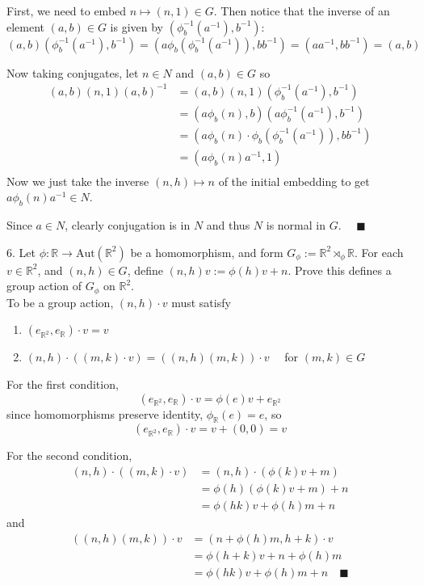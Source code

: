 \documentclass[11pt]{article}
\newcommand{\R}{\mathbb{R}}
\newcommand{\Aut}{\text{Aut}}
\newcommand{\lra}{\longrightarrow}
\newcommand{\qed}{\quad \blacksquare}
\begin{document}
		First, we need to embed $n \mapsto (n, 1) \in G$. Then notice that the inverse of an element $(a, b) \in G$ is given by $(\phi_b^{-1}(a^{-1}), b^{-1})$: 
		\[(a, b)(\phi_b^{-1}(a^{-1}), b^{-1}) = (a\phi_b(\phi_b^{-1}(a^{-1})), bb^{-1}) = (aa^{-1}, bb^{-1}) = (a, b)\]

		Now taking conjugates, let $n \in N$ and $(a, b) \in G$ so 
		\begin{align*}
			(a, b)(n, 1)(a, b)^{-1} &= (a, b)(n, 1)(\phi_b^{-1}(a^{-1}), b^{-1})\\ 
				&= (a\phi_b(n), b)(a\phi_b^{-1}(a^{-1}), b^{-1})\\
				&= (a\phi_b(n) \cdot \phi_b(\phi_b^{-1}(a^{-1})), bb^{-1})\\
				&= (a\phi_b(n)a^{-1}, 1)\\
		\end{align*}
		Now we just take the inverse $(n, h) \mapsto n$ of the initial embedding to get $a\phi_b(n)a^{-1}\in N$. 
			
		Since $a \in N$, clearly conjugation is in $N$ and thus $N$ is normal in $G$. $\qed$ 
	\color{black}

\pagebreak

6.  Let $\phi: \R \lra \Aut(\R^{2})$ be a homomorphism, and form $G_{\phi} := \R^{2} \rtimes_{\phi} \R$.  For each $v \in \R^{2}$, and $(n,h) \in G$, define $(n,h)v:= \phi(h)v + n$.  Prove this defines a group action of $G_{\phi}$ on $\R^{2}$.\\

	\color{blue}
		To be a group action, $(n, h) \cdot v$ must satisfy  
		\begin{enumerate}
			\item $(e_{\R^2}, e_\R)\cdot v = v$ 
			\item $(n, h) \cdot ((m, k) \cdot v) = ((n, h)(m, k)) \cdot v \quad$ for $(m, k) \in G$
		\end{enumerate}

		For the first condition,
		\[(e_{\R^2}, e_{\R}) \cdot v = \phi(e)v + e_{\R^2}\]
		since homomorphisms preserve identity, $\phi_{\R}(e) = e$, so 
		\[(e_{\R^2}, e_{\R}) \cdot v = v + (0, 0) = v\] 

		For the second condition, 
		\begin{align*}
			(n, h) \cdot ((m, k) \cdot v) &= (n, h) \cdot (\phi(k)v + m)\\ 
				&= \phi(h)(\phi(k)v + m) + n\\ 
				&= \phi(hk)v + \phi(h)m + n
		\end{align*}
		and 
		\begin{align*}
			((n, h)(m, k)) \cdot v &= (n + \phi(h)m, h + k) \cdot v\\ 
				&= \phi(h + k)v + n + \phi(h)m \\ 
				&= \phi(hk)v + \phi(h)m + n \qed
		\end{align*}
\end{document}
